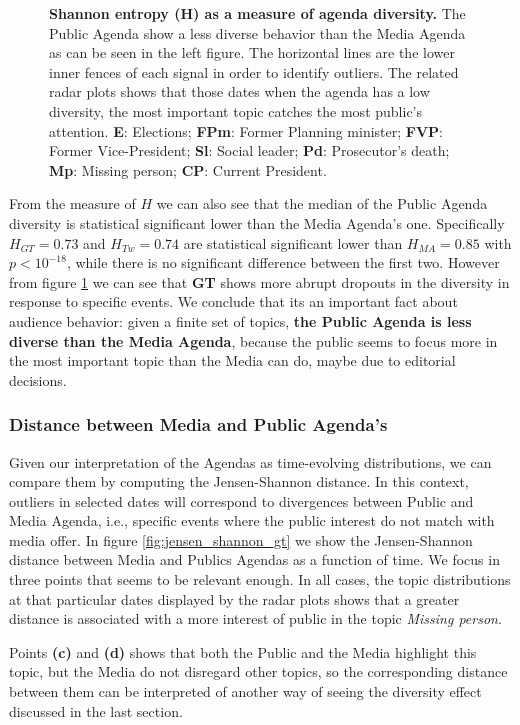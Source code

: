 \documentclass[10pt,letterpaper]{article}
\begin{document}
\begin{figure}[h!]
\centering
\caption{\textbf{Shannon entropy (H) as a measure of agenda diversity.} The Public Agenda show a less diverse behavior than the Media Agenda as can be seen in the left figure. The horizontal lines are the lower inner fences of each signal in order to identify outliers. The related radar plots shows that those dates when the agenda has a low diversity, the most important topic catches the most public’s attention. \textbf{E}: Elections; \textbf{FPm}: Former Planning minister; \textbf{FVP}: Former Vice-President; \textbf{Sl}: Social leader; \textbf{Pd}: Prosecutor's death; \textbf{Mp}: Missing person; \textbf{CP}: Current President.}
\label{fig:shannon_entropy_agendas}
\end{figure}

\par From the measure of $H$ we can also see that the median of the Public Agenda diversity is statistical significant lower than the Media Agenda's one.
Specifically $H_{GT} = 0.73$ and $H_{Tw} = 0.74$ are statistical significant lower than $H_{MA} = 0.85$ with $p < 10^{-18}$, while there is no significant difference between the first two. 
However from figure \ref{fig:shannon_entropy_agendas} we can see that \textbf{GT} shows more abrupt dropouts in the diversity in response to specific events.
We conclude that its an important fact about audience behavior: given a finite set of topics, \textbf{the Public Agenda is less diverse than the Media Agenda}, because the public seems to focus more in the most important topic than the Media can do, maybe due to editorial decisions.

\subsubsection*{Distance between Media and Public Agenda's }


\par Given our interpretation of the Agendas as time-evolving distributions, we can  compare them by computing the Jensen-Shannon distance. In this context, outliers in selected dates will correspond to divergences between Public and Media Agenda, i.e., specific events where the public interest do not match with media offer.
In figure \ref{fig:jensen_shannon_gt} we show the Jensen-Shannon distance between Media and Publics Agendas as a function of time. We focus in three points that seems to be relevant enough. In all cases, the topic distributions at that particular dates displayed by  the radar plots shows that a greater distance is associated with a more interest of public in the topic \emph{Missing person}. 
\par Points \textbf{(c)} and \textbf{(d)} shows that both the Public and the Media highlight this topic, but the Media do not disregard other topics, so the corresponding distance between them can be interpreted  of another way of seeing the diversity effect discussed in the last section.
\end{document}
